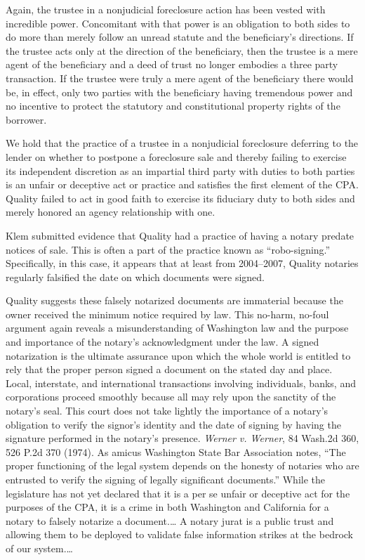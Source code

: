 Again, the trustee in a nonjudicial foreclosure action has been vested
with incredible power. Concomitant with that power is an obligation to both
sides to do more than merely follow an unread statute and the beneficiary's
directions. If the trustee acts only at the direction of the beneficiary, then
the trustee is a mere agent of the beneficiary and a deed of trust no longer
embodies a three party transaction. If the trustee were truly a mere agent of
the beneficiary there would be, in effect, only two parties with the
beneficiary having tremendous power and no incentive to protect the statutory
and constitutional property rights of the borrower.

We hold that the practice of a trustee in a nonjudicial foreclosure
deferring to the lender on whether to postpone a foreclosure sale and thereby
failing to exercise its independent discretion as an impartial third party with
duties to both parties is an unfair or deceptive act or practice and satisfies
the first element of the CPA. Quality failed to act in good faith to exercise
its fiduciary duty to both sides and merely honored an agency relationship with
one.


Klem submitted evidence that Quality had a practice of having a notary
predate notices of sale. This is often a part of the practice known as
``robo-signing.'' Specifically, in this case, it appears that at least from
2004--2007, Quality notaries regularly falsified the date on which documents
were signed.

Quality suggests these falsely notarized documents are immaterial
because the owner received the minimum notice required by law. This no-harm,
no-foul argument again reveals a misunderstanding of Washington law and the
purpose and importance of the notary's acknowledgment under the law. A signed
notarization is the ultimate assurance upon which the whole world is entitled
to rely that the proper person signed a document on the stated day and place.
Local, interstate, and international transactions involving individuals, banks,
and corporations proceed smoothly because all may rely upon the sanctity of 
the notary's seal. This court does not take lightly the importance of a
notary's obligation to verify the signor's identity and the date of signing by
having the signature performed in the notary's presence. \emph{Werner v.
Werner}, 84 Wash.2d 360, 526 P.2d 370 (1974). As amicus Washington State Bar
Association notes, ``The proper functioning of the legal system depends on the
honesty of notaries who are entrusted to verify the signing of legally
significant documents.'' While the legislature has not yet declared that it is a
per se unfair or deceptive act for the purposes of the CPA, it is a crime in
both Washington and California for a notary to falsely notarize a document.\dots
A notary jurat is a public trust and allowing them to be deployed to validate
false information strikes at the bedrock of our system.\dots 

